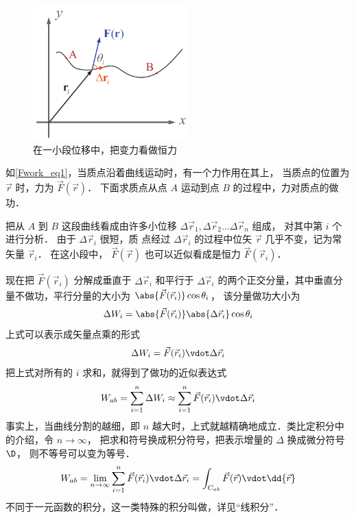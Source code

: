 

\begin{figure}[ht]
\centering
\includegraphics[width=6cm]{./figures/Fwork.pdf}
\caption{在一小段位移中，把变力看做恒力}\label{Fwork_eq1}
\end{figure}

如\autoref{Fwork_eq1}，当质点沿着曲线运动时，有一个力作用在其上， 当质点的位置为 $\vec r$ 时，力为 $\vec F(\vec r)$． 下面求质点从点 $A$ 运动到点 $B$ 的过程中，力对质点的做功．

把从 $A$ 到 $B$ 这段曲线看成由许多小位移 $\Delta \vec r_1, \Delta \vec r_2 \dots \Delta \vec r_n$ 组成， 对其中第 $i$ 个进行分析． 由于 $\Delta \vec r_i$ 很短，质
点经过 $\Delta \vec r_i$ 的过程中位矢 $\vec r$ 几乎不变，记为常矢量 $\vec r_i$． 在这小段中，  $\vec F(\vec r)$ 也可以近似看成是恒力 $\vec F(\vec r_i)$． 

现在把 $\vec F(\vec r_i)$ 分解成垂直于 $\Delta \vec r_i$ 和平行于 $\Delta \vec r_i$ 的两个正交分量，其中垂直分量不做功，平行分量的大小为 $ \abs{\vec F(\vec r_i)} \cos \theta _i$， 该分量做功大小为
\begin{equation}
\Delta W_i = \abs{\vec F(\vec r_i)} \abs{\Delta \vec r_i} \cos \theta _i
\end{equation}
上式可以表示成矢量点乘的形式
\begin{equation}\label{Fwork_eq2}
\Delta W_i = \vec F(\vec r_i) \vdot \Delta \vec r_i
\end{equation}
把上式对所有的 $i$ 求和，就得到了做功的近似表达式
\begin{equation}
W_{ab} = \sum_{i = 1}^n \Delta W_i  \approx \sum_{i = 1}^n \vec F(\vec r_i) \vdot \Delta \vec r_i 
\end{equation} 
事实上，当曲线分割的越细，即 $n$ 越大时，上式就越精确地成立．类比定积分中的介绍，令 $n \to \infty $， 把求和符号换成积分符号，把表示增量的 $\Delta $ 换成微分符号 $\D$， 则不等号可以变为等号．
\begin{equation}
W_{ab} = \lim_{n \to \infty } \sum_{i = 1}^n \vec F(\vec r_i) \vdot \Delta \vec r_i  = \int_{C_{ab}} \vec F(\vec r) \vdot \dd{\vec r}
\end{equation} 
不同于一元函数的积分，这一类特殊的积分叫做，详见“线积分”．

